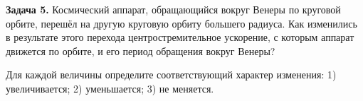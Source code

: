 
\begin{taskbasic}[code={\label{task:newton2_v13_n6}}]
\textbf{Задача 5.} Космический аппарат, обращающийся вокруг Венеры по круговой орбите, перешёл на другую круговую орбиту большего радиуса. Как изменились в результате этого перехода центростремительное ускорение, с которым аппарат движется по орбите, и его период обращения вокруг Венеры?

Для каждой величины определите соответствующий характер изменения:
1) увеличивается;
2) уменьшается;
3) не меняется.

\end{taskbasic}

